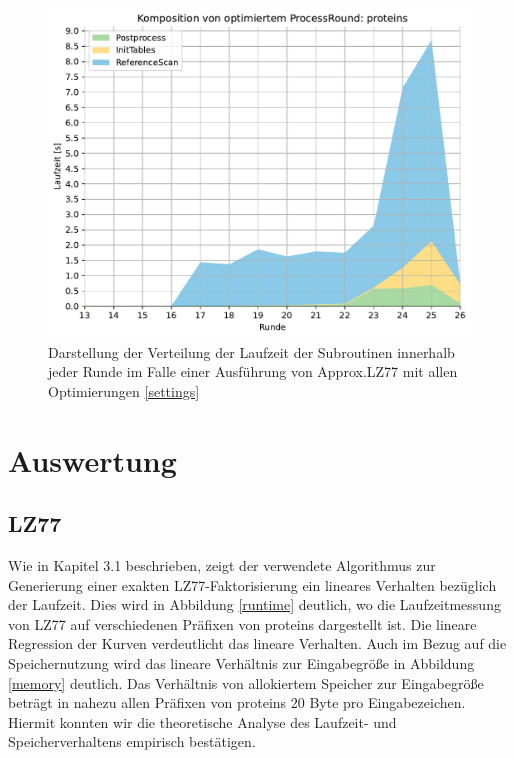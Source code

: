 \begin{figure}[H]
    \centering
    \includegraphics[scale=0.7]{Images/progressive_opt_stack.pdf}
    \caption{Darstellung der Verteilung der Laufzeit der Subroutinen innerhalb jeder Runde im Falle einer Ausführung von Approx.LZ77 mit allen Optimierungen \ref{settings}}
    \label{opt}
\end{figure}

\section{Auswertung}
\subsection{LZ77}
Wie in Kapitel 3.1 beschrieben, zeigt der verwendete Algorithmus zur Generierung einer exakten LZ77-Faktorisierung ein lineares Verhalten bezüglich der Laufzeit.
Dies wird in Abbildung \ref{runtime} deutlich, wo die Laufzeitmessung von LZ77 auf verschiedenen Präfixen von proteins dargestellt ist. Die lineare Regression der
Kurven verdeutlicht das lineare Verhalten. Auch im Bezug auf die Speichernutzung wird das lineare Verhältnis zur Eingabegröße in Abbildung \ref{memory} deutlich.
Das Verhältnis von allokiertem Speicher zur Eingabegröße beträgt in nahezu allen Präfixen von proteins 20 Byte pro Eingabezeichen. Hiermit konnten wir die theoretische
Analyse des Laufzeit- und Speicherverhaltens empirisch bestätigen.

